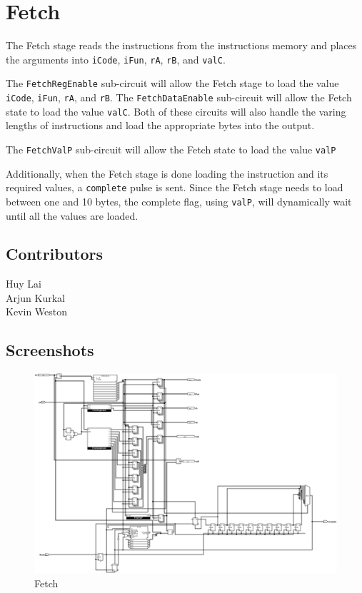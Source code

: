 \clearpage
\section*{Fetch}
The Fetch stage reads the instructions from the instructions memory and places the arguments into \verb+iCode+, \verb+iFun+, \verb+rA+, \verb+rB+, and \verb+valC+.

\noindent
The \verb+FetchRegEnable+ sub-circuit will allow the Fetch stage to load the value \verb+iCode+, \verb+iFun+, \verb+rA+, and \verb+rB+. The \verb+FetchDataEnable+ sub-circuit will allow the Fetch state to load the value \verb+valC+. Both of these circuits will also handle the varing lengths of instructions and load the appropriate bytes into the output.

\noindent
The \verb+FetchValP+ sub-circuit will allow the Fetch state to load the value \verb+valP+

\noindent
Additionally, when the Fetch stage is done loading the instruction and its required values, a \verb+complete+ pulse is sent. Since the Fetch stage needs to load between one and 10 bytes, the complete flag, using \verb+valP+, will dynamically wait until all the values are loaded.
\subsection*{Contributors}
Huy Lai\\
Arjun Kurkal\\
Kevin Weston

\clearpage
\subsection*{Screenshots}
\begin{figure}[!ht]
    \centering
    \includegraphics[width=\textwidth]{Images/Fetch.png}
    \caption{Fetch}
\end{figure}

\clearpage
\noindent